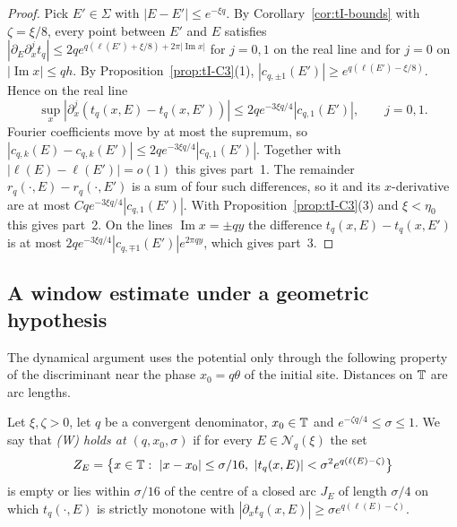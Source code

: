 \begin{proof}
Pick $E'\in\Sigma$ with $|E-E'|\le e^{-\xi q}$. By Corollary~\ref{cor:tI-bounds} with $\zeta=\xi/8$, every point between $E'$ and $E$ satisfies $|\partial_E\partial_x^jt_q|\le2qe^{q(\ell(E')+\xi/8)+2\pi|\operatorname{Im}x|}$ for $j=0,1$ on the real line and for $j=0$ on $|\operatorname{Im}x|\le qh$. By Proposition~\ref{prop:tI-C3}(1), $|c_{q,\pm1}(E')|\ge e^{q(\ell(E')-\xi/8)}$. Hence on the real line
\[
\sup_x|\partial_x^j(t_q(x,E)-t_q(x,E'))|\le2qe^{-3\xi q/4}|c_{q,1}(E')|,\qquad j=0,1.
\]
Fourier coefficients move by at most the supremum, so $|c_{q,k}(E)-c_{q,k}(E')|\le2qe^{-3\xi q/4}|c_{q,1}(E')|$. Together with $|\ell(E)-\ell(E')|=o(1)$ this gives part~1. The remainder $r_q(\cdot,E)-r_q(\cdot,E')$ is a sum of four such differences, so it and its $x$-derivative are at most $C qe^{-3\xi q/4}|c_{q,1}(E')|$. With Proposition~\ref{prop:tI-C3}(3) and $\xi<\eta_0$ this gives part~2. On the lines $\operatorname{Im}x=\pm qy$ the difference $t_q(x,E)-t_q(x,E')$ is at most $2qe^{-3\xi q/4}|c_{q,\mp1}(E')|e^{2\pi qy}$, which gives part~3.
\end{proof}

\subsection{A window estimate under a geometric hypothesis}\label{sec:tI-window}

The dynamical argument uses the potential only through the following property of the discriminant near the phase $x_0=q\theta$ of the initial site. Distances on $\mathbb T$ are arc lengths.

\begin{definition}\label{def:tI-W}
Let $\xi,\zeta>0$, let $q$ be a convergent denominator, $x_0\in\mathbb T$ and $e^{-\zeta q/4}\le\sigma\le1$. We say that \emph{(W) holds at $(q,x_0,\sigma)$} if for every $E\in\mathcal N_q(\xi)$ the set
\[
Z_E=\bigl\{x\in\T:\ |x-x_0|\le\sigma/16,\ |t_q(x,E)|<\sigma^2e^{q(\ell(E)-\zeta)}\bigr\}
\]
is empty or lies within $\sigma/16$ of the centre of a closed arc $J_E$ of length $\sigma/4$ on which $t_q(\cdot,E)$ is strictly monotone with $|\partial_xt_q(x,E)|\ge\sigma e^{q(\ell(E)-\zeta)}$.
\end{definition}

